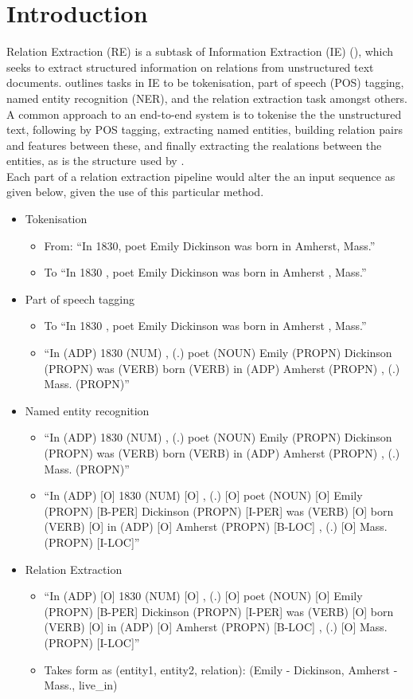 \documentclass[10pt, a4paper]{article}
\begin{document}
\section{Introduction}
Relation Extraction (RE) is a subtask of Information Extraction (IE) (), which seeks to extract structured information on relations from unstructured text documents.  outlines tasks in IE to be tokenisation, part of speech (POS) tagging, named entity recognition (NER), and the relation extraction task amongst others. A common approach to an end-to-end system is to tokenise the the unstructured text, following by POS tagging, extracting named entities, building relation pairs and features between these, and finally extracting the realations between the entities, as is the structure used by .\\
Each part of a relation extraction pipeline would alter the an input sequence as given below, given the use of this particular method.

\begin{itemize}
  \item{Tokenisation}
      \begin{itemize}
      \item{From: ``In 1830, poet Emily Dickinson was born in Amherst, Mass.''} 
      \item{To ``In 1830 , poet Emily Dickinson was born in Amherst , Mass.''}
    \end{itemize}
  \item{Part of speech tagging}
    \begin{itemize}
      \item{To ``In 1830 , poet Emily Dickinson was born in Amherst , Mass.''}
      \item{``In (ADP) 1830 (NUM) , (.) poet (NOUN) Emily (PROPN) Dickinson (PROPN) was (VERB) born (VERB) in (ADP) Amherst (PROPN) , (.) Mass. (PROPN)''}
    \end{itemize}
  \item{Named entity recognition}
    \begin{itemize}
      \item{``In (ADP) 1830 (NUM) , (.) poet (NOUN) Emily (PROPN) Dickinson (PROPN) was (VERB) born (VERB) in (ADP) Amherst (PROPN) , (.) Mass. (PROPN)''}
      \item{``In (ADP) [O] 1830 (NUM) [O] , (.) [O]  poet (NOUN) [O] Emily (PROPN) [B-PER] Dickinson (PROPN) [I-PER] was (VERB) [O] born (VERB) [O] in (ADP) [O] Amherst (PROPN) [B-LOC] , (.) [O] Mass. (PROPN) [I-LOC]''}
    \end{itemize}
  \item{Relation Extraction}
    \begin{itemize}
      \item{``In (ADP) [O] 1830 (NUM) [O] , (.) [O]  poet (NOUN) [O] Emily (PROPN) [B-PER] Dickinson (PROPN) [I-PER] was (VERB) [O] born (VERB) [O] in (ADP) [O] Amherst (PROPN) [B-LOC] , (.) [O] Mass. (PROPN) [I-LOC]''}
      \item{Takes form as (entity1, entity2, relation): (Emily - Dickinson, Amherst - Mass., live\_in)}
    \end{itemize}
\end{itemize}
\end{document}
